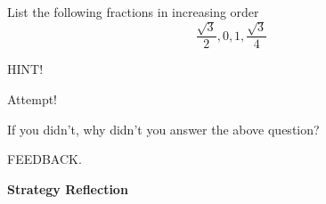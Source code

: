 \documentclass{ximera}
\begin{document}
\begin{problem} 
\begin{problem}
    List the following fractions in increasing order
    $$\frac{\sqrt{3}}{2}, 0, 1, \frac{\sqrt{3}}{4}$$
    
    \begin{hint}
    HINT!
    \end{hint}
    
    
  \begin{multipleChoice}
       
  \begin{feedback}[attempt]
  Attempt!
  \end{feedback}
  
  \end{multipleChoice}
  
\end{problem}
\begin{question}
  

  If you didn't, why didn't you answer the above question?
  
  \begin{multipleChoice}
      
      \begin{feedback}[attempt]
      FEEDBACK.
      \end{feedback}
      
  \end{multipleChoice}
  
\end{question}
\end{problem}


\begin{center} \textbf{Strategy Reflection} \end{center}
\end{document}
